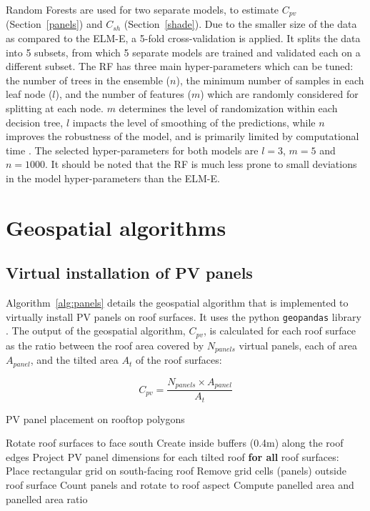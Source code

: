 Random Forests are used for two separate models, to estimate $C_{\mathit{pv}}$ (Section~\ref{panels}) and $C_{sh}$ (Section~\ref{shade}). Due to the smaller size of the data as compared to the ELM-E, a 5-fold cross-validation is applied. It splits the data into 5 subsets, from which 5 separate models are trained and validated each on a different subset. 
The RF has three main hyper-parameters which can be tuned: the number of trees in the ensemble ($n$), the minimum number of samples in each leaf node ($l$), and the number of features ($m$) which are randomly considered for splitting at each node. $m$ determines the level of randomization within each decision tree, $l$ impacts the level of smoothing of the predictions, while $n$ improves the robustness of the model, and is primarily limited by computational time \cite{breiman_random_2001}.
The selected hyper-parameters for both models are  $l = 3$, $m = 5$ and $n = 1000$. It should be noted that the RF is much less prone to small deviations in the model hyper-parameters than the ELM-E.


\section{Geospatial algorithms}

\subsection*{Virtual installation of PV panels}
\label{app:virtualPV}

Algorithm~\ref{alg:panels} details the geospatial algorithm that is implemented to virtually install PV panels on roof surfaces. It uses the python \texttt{geopandas} library \cite{kelsey_jordahl_geopandas/geopandas:_2019}. 
The output of the geospatial algorithm, $C_{\mathit{pv}}$, is calculated for each roof surface as the ratio between the roof area covered by $N_{\mathit{panels}}$ virtual panels, each of area $A_{\mathit{panel}}$, and the tilted area $A_{t}$ of the roof surfaces: 

\begin{equation}
\label{eq:cpv}
C_{\mathit{pv}} = \frac{N_{\mathit{panels}} \times A_{\mathit{panel}}}{A_t}
\end{equation}

\begin{algorithm}[htbp]
\caption{PV panel placement on rooftop polygons}
\label{alg:panels}
\begin{algorithmic}[1]
  \footnotesize
  \State Rotate roof surfaces to face south
  \State Create inside buffers (0.4m) along the roof edges
  \State Project PV panel dimensions for each tilted roof
  \Statex \textbf{for all} roof surfaces:
    \State \qquad Place rectangular grid on south-facing roof
    \State \qquad Remove grid cells (panels) outside roof surface
    \State \qquad Count panels and rotate to roof aspect
  \State Compute panelled area and panelled area ratio
\end{algorithmic}
\end{algorithm}

